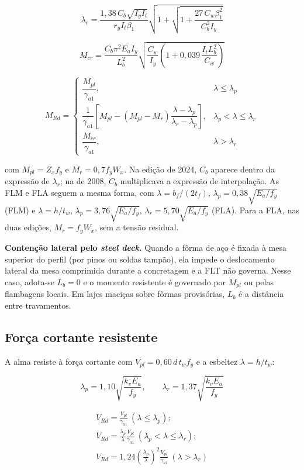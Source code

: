 \[
  \lambda_r = \frac{1{,}38\, C_b \sqrt{I_y I_t}}{r_y I_t \beta_1}\sqrt{1 + \sqrt{1 + \frac{27\, C_w \beta_1^2}{C_b^2 I_y}}}
\]

\[
  M_{cr} = \frac{C_b \pi^2 E_a I_y}{L_b^2}\sqrt{\frac{C_w}{I_y}\left(1 + 0{,}039\,\frac{I_t L_b^2}{C_w}\right)}
\]

\[
  M_{Rd} = \begin{cases} \dfrac{M_{pl}}{\gamma_{a1}}, & \lambda \le \lambda_p \\[2mm] \dfrac{1}{\gamma_{a1}}\left[M_{pl} - (M_{pl} - M_r)\dfrac{\lambda - \lambda_p}{\lambda_r - \lambda_p}\right], & \lambda_p < \lambda \le \lambda_r \\[2mm] \dfrac{M_{cr}}{\gamma_{a1}}, & \lambda > \lambda_r \end{cases}
\]

com $M_{pl} = Z_x f_y$ e $M_r = 0{,}7 f_y W_x$. Na edição de 2024, $C_b$ aparece dentro da expressão de $\lambda_r$; na de 2008, $C_b$ multiplicava a expressão de interpolação. As FLM e FLA seguem a mesma forma, com $\lambda = b_f/(2t_f)$, $\lambda_p = 0{,}38\sqrt{E_a/f_y}$ (FLM) e $\lambda = h/t_w$, $\lambda_p = 3{,}76\sqrt{E_a/f_y}$, $\lambda_r = 5{,}70\sqrt{E_a/f_y}$ (FLA). Para a FLA, nas duas edições, $M_r = f_y W_x$, sem a tensão residual.

\textbf{Contenção lateral pelo \emph{steel deck}.} Quando a fôrma de aço é fixada à mesa superior do perfil (por pinos ou soldas tampão), ela impede o deslocamento lateral da mesa comprimida durante a concretagem e a FLT não governa. Nesse caso, adota-se $L_b = 0$ e o momento resistente é governado por $M_{pl}$ ou pelas flambagens locais. Em lajes maciças sobre fôrmas provisórias, $L_b$ é a distância entre travamentos.

\subsection{Força cortante resistente}\label{sec:2.4.3}
A alma resiste à força cortante com $V_{pl} = 0{,}60\, d\, t_w f_y$ e a esbeltez $\lambda = h/t_w$:

\[
  \lambda_p = 1{,}10\sqrt{\frac{k_v E_a}{f_y}}, \qquad \lambda_r = 1{,}37\sqrt{\frac{k_v E_a}{f_y}}
\]

\begin{gather*}
  V_{Rd} = \frac{V_{pl}}{\gamma_{a1}} \ (\lambda \le \lambda_p); \\
  V_{Rd} = \frac{\lambda_p}{\lambda}\frac{V_{pl}}{\gamma_{a1}} \ (\lambda_p < \lambda \le \lambda_r); \\
  V_{Rd} = 1{,}24\left(\frac{\lambda_p}{\lambda}\right)^2 \frac{V_{pl}}{\gamma_{a1}} \ (\lambda > \lambda_r)
\end{gather*}

